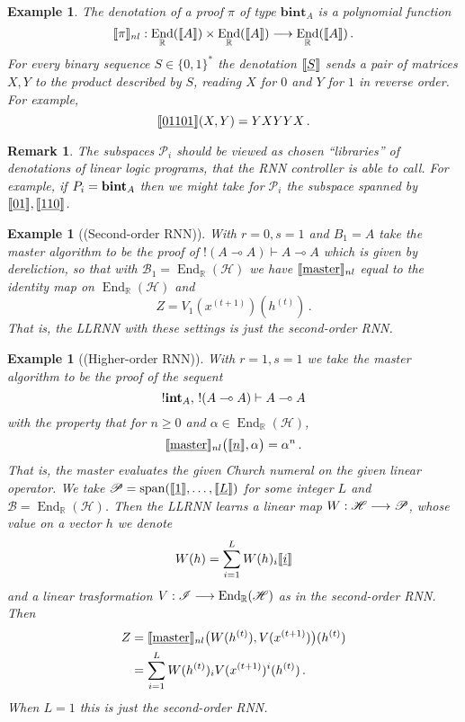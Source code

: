 \documentclass[english,letter paper,12pt,leqno]{article}
\theoremstyle{example}
\newtheorem{example}[theorem]{Example}
\newtheorem{remark}[theorem]{Remark}
\numberwithin{equation}{section}
\def\be{\begin{equation}}
\def\ee{\end{equation}}
\DeclareMathOperator{\End}{End}
\begin{document}
\begin{example}\label{example_2} The denotation of a proof $\pi$ of type $\textbf{bint}_A$ is a polynomial function
\[
\den{\pi}_{nl}: \End_{\mathbb{R}}(\den{A}) \times \End_{\mathbb{R}}(\den{A}) \lto \End_{\mathbb{R}}(\den{A})\,.
\]
For every binary sequence $S \in \{0,1\}^*$ the denotation $\llbracket \underline{S} \rrbracket$ sends a pair of matrices $X,Y$ to the product described by $S$, reading $X$ for $0$ and $Y$ for $1$ in reverse order. For example,
\[
\llbracket \underline{01101} \rrbracket(X,Y) = Y X Y Y X\,.
\]
\end{example}

\begin{remark} The subspaces $\mathscr{P}_i$ should be viewed as chosen ``libraries'' of denotations of linear logic programs, that the RNN controller is able to call. For example, if $P_i = \textbf{bint}_A$ then we might take for $\mathscr{P}_i$ the subspace spanned by $\llbracket \underline{01} \rrbracket, \llbracket \underline{110} \rrbracket$.
\end{remark}

\begin{example}[(Second-order RNN)] With $r = 0,s = 1$ and $B_1 = A$ take the master algorithm to be the proof of ${!}(A \multimap A) \vdash A \multimap A$ which is given by dereliction, so that with $\mathscr{B}_1 = \End_{\mathbb{R}}(\mathscr{H})$ we have $\llbracket \underline{\mathrm{master}} \rrbracket_{nl}$ equal to the identity map on $\End_{\mathbb{R}}(\mathscr{H})$ and
\[
Z = V_1(x^{(t+1)})(h^{(t)})\,.
\]
That is, the LLRNN with these settings is just the second-order RNN.
\end{example}

\begin{example}[(Higher-order RNN)] With $r = 1, s = 1$ we take the master algorithm to be the proof of the sequent
\[
{!}\textbf{int}_A, \, {!}(A \multimap A) \vdash A \multimap A
\]
with the property that for $n \ge 0$ and $\alpha \in \End_{\mathbb{R}}(\mathscr{H})$,
\be
\den{\master}_{nl}\big( \den{\underline{n}}, \alpha \big) = \alpha^n\,.
\ee
That is, the master evaluates the given Church numeral on the given linear operator. We take $\mathscr{P} = \operatorname{span}(\llbracket \underline{1} \rrbracket, \ldots, \llbracket \underline{L} \rrbracket)$ for some integer $L$ and $\mathscr{B} = \End_{\mathbb{R}}(\mathscr{H})$. Then the LLRNN learns a linear map $W: \mathscr{H} \longrightarrow \mathscr{P}$, whose value on a vector $h$ we denote
\[
W(h) = \sum_{i=1}^L W(h)_i \llbracket \underline{i} \rrbracket
\]
and a linear trasformation $V: \mathscr{I} \lto \End_{\mathbb{R}}(\mathscr{H})$ as in the second-order RNN. Then
\begin{align*}
Z &= \llbracket \underline{\textup{master}} \rrbracket_{nl}\big( W(h^{(t)}), V(x^{(t+1)}) \big)(h^{(t)})\\
&= \sum_{i=1}^L W(h^{(t)})_i V(x^{(t+1)})^{i}(h^{(t)})\,.
\end{align*}
When $L = 1$ this is just the second-order RNN.
\end{example}
\end{document}
